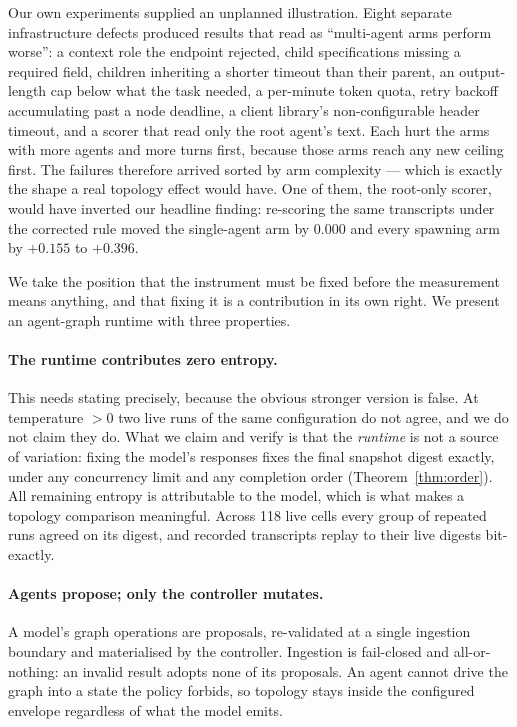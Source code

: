 \documentclass[10pt]{article}
\begin{document}
Our own experiments supplied an unplanned illustration. Eight separate
infrastructure defects produced results that read as ``multi-agent arms perform
worse'': a context role the endpoint rejected, child specifications missing a
required field, children inheriting a shorter timeout than their parent, an
output-length cap below what the task needed, a per-minute token quota, retry
backoff accumulating past a node deadline, a client library's non-configurable
header timeout, and a scorer that read only the root agent's text. Each hurt the
arms with more agents and more turns first, because those arms reach any new
ceiling first. The failures therefore arrived sorted by arm complexity --- which
is exactly the shape a real topology effect would have. One of them, the
root-only scorer, would have inverted our headline finding: re-scoring the same
transcripts under the corrected rule moved the single-agent arm by $0.000$ and
every spawning arm by $+0.155$ to $+0.396$.

We take the position that the instrument must be fixed before the measurement
means anything, and that fixing it is a contribution in its own right. We
present an agent-graph runtime with three properties.

\paragraph{The runtime contributes zero entropy.}
This needs stating precisely, because the obvious stronger version is false. At
temperature $>0$ two live runs of the same configuration do not agree, and we do
not claim they do. What we claim and verify is that the \emph{runtime} is not a
source of variation: fixing the model's responses fixes the final snapshot
digest exactly, under any concurrency limit and any completion order
(Theorem~\ref{thm:order}). All remaining entropy is attributable to the model,
which is what makes a topology comparison meaningful. Across 118 live cells
every group of repeated runs agreed on its digest, and recorded transcripts
replay to their live digests bit-exactly.

\paragraph{Agents propose; only the controller mutates.}
A model's graph operations are proposals, re-validated at a single ingestion
boundary and materialised by the controller. Ingestion is fail-closed and
all-or-nothing: an invalid result adopts none of its proposals. An agent cannot
drive the graph into a state the policy forbids, so topology stays inside the
configured envelope regardless of what the model emits.
\end{document}

